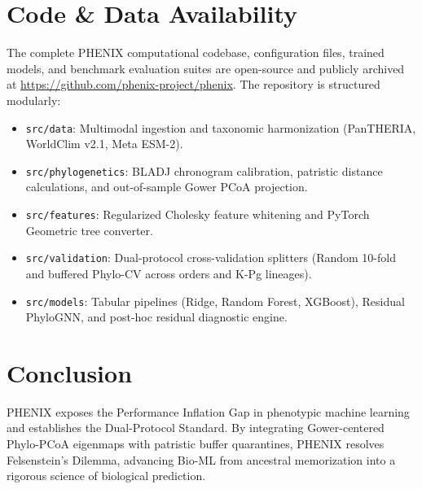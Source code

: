 \documentclass[sigconf,nonacm]{acmart}
\begin{document}
\section{Code \& Data Availability}
The complete PHENIX computational codebase, configuration files, trained models, and benchmark evaluation suites are open-source and publicly archived at \url{https://github.com/phenix-project/phenix}. The repository is structured modularly:
\begin{itemize}
    \item \texttt{src/data}: Multimodal ingestion and taxonomic harmonization (PanTHERIA, WorldClim v2.1, Meta ESM-2).
    \item \texttt{src/phylogenetics}: BLADJ chronogram calibration, patristic distance calculations, and out-of-sample Gower PCoA projection.
    \item \texttt{src/features}: Regularized Cholesky feature whitening and PyTorch Geometric tree converter.
    \item \texttt{src/validation}: Dual-protocol cross-validation splitters (Random 10-fold and buffered Phylo-CV across orders and K-Pg lineages).
    \item \texttt{src/models}: Tabular pipelines (Ridge, Random Forest, XGBoost), Residual PhyloGNN, and post-hoc residual diagnostic engine.
\end{itemize}

\section{Conclusion}
PHENIX exposes the Performance Inflation Gap in phenotypic machine learning and establishes the Dual-Protocol Standard. By integrating Gower-centered Phylo-PCoA eigenmaps with patristic buffer quarantines, PHENIX resolves Felsenstein's Dilemma, advancing Bio-ML from ancestral memorization into a rigorous science of biological prediction.



\end{document}
